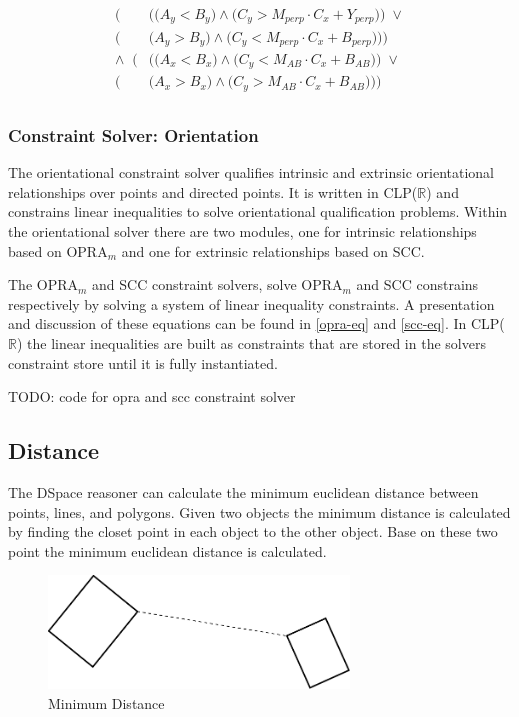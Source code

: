 \documentclass[12pt]{ucthesis}
\begin{document}
\begin{equation}\label{scc-eq}
\begin{aligned}
\Big(&\Big(\Big(A_{y} < B_{y}\Big) \wedge \Big(C_{y} > M_{perp} \cdot C_{x} + Y_{perp}\Big)\Big) \; \lor \\
\Big(&\Big(A_{y} > B_{y}\Big) \wedge \Big(C_{y} < M_{perp} \cdot C_{x} + B_{perp}\Big)\Big)\Big) \\
\wedge \;\; \Big(&\Big(\Big(A_{x} < B_{x}\Big) \wedge \Big(C_{y} < M_{AB} \cdot C_{x} + B_{AB}\Big)\Big) \; \lor \\
\Big(&\Big(A_{x} > B_{x}\Big) \wedge \Big(C_{y} > M_{AB} \cdot C_{x} + B_{AB}\Big)\Big)\Big) \\
\end{aligned}
\end{equation}

\subsubsection{Constraint Solver: Orientation}
The orientational constraint solver qualifies intrinsic and extrinsic orientational relationships over points and directed points. It is written in CLP($\mathbb{R}$) and constrains linear inequalities to solve orientational qualification problems. Within the orientational solver there are two modules, one for intrinsic relationships based on OPRA$_{m}$ and one for extrinsic relationships based on SCC.

The OPRA$_{m}$ and SCC constraint solvers, solve OPRA$_{m}$ and SCC constrains respectively by solving a system of linear inequality constraints. A presentation and discussion of these equations can be found in \ref{opra-eq} and \ref{scc-eq}. In CLP($\mathbb{R}$) the linear inequalities are built as constraints that are stored in the solvers constraint store until it is fully instantiated. 

TODO: code for opra and scc constraint solver

\subsection{Distance}
The DSpace reasoner can calculate the minimum euclidean distance between points, lines, and polygons. Given two objects the minimum distance is calculated by finding the closet point in each object to the other object. Base on these two point the minimum euclidean distance is calculated. 

\begin{figure}[H]
\centering
\includegraphics[width=80mm]{min-dist}
\caption{Minimum Distance}
\label{min-dist}
\end{figure}
\end{document}
